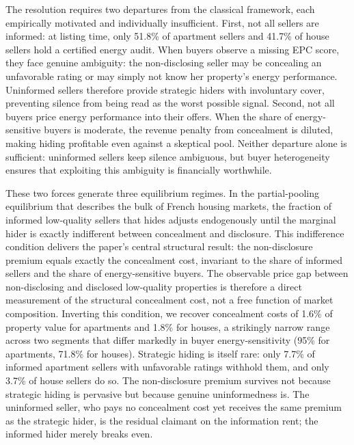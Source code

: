 \documentclass[10pt,letterpaper]{bp-template-concise}
\begin{document}
The resolution requires two departures from the classical framework, each empirically motivated and individually insufficient. First, not all sellers are informed: at listing time, only 51.8\% of apartment sellers and 41.7\% of house sellers hold a certified energy audit. When buyers observe a missing EPC score, they face genuine ambiguity: the non-disclosing seller may be concealing an unfavorable rating or may simply not know her property's energy performance. Uninformed sellers therefore provide strategic hiders with involuntary cover, preventing silence from being read as the worst possible signal. Second, not all buyers price energy performance into their offers. When the share of energy-sensitive buyers is moderate, the revenue penalty from concealment is diluted, making hiding profitable even against a skeptical pool. Neither departure alone is sufficient: uninformed sellers keep silence ambiguous, but buyer heterogeneity ensures that exploiting this ambiguity is financially worthwhile.

These two forces generate three equilibrium regimes. In the partial-pooling equilibrium that describes the bulk of French housing markets, the fraction of informed low-quality sellers that hides adjusts endogenously until the marginal hider is exactly indifferent between concealment and disclosure. This indifference condition delivers the paper's central structural result: the non-disclosure premium equals exactly the concealment cost, invariant to the share of informed sellers and the share of energy-sensitive buyers. The observable price gap between non-disclosing and disclosed low-quality properties is therefore a direct measurement of the structural concealment cost, not a free function of market composition. Inverting this condition, we recover concealment costs of 1.6\% of property value for apartments and 1.8\% for houses, a strikingly narrow range across two segments that differ markedly in buyer energy-sensitivity (95\% for apartments, 71.8\% for houses). Strategic hiding is itself rare: only 7.7\% of informed apartment sellers with unfavorable ratings withhold them, and only 3.7\% of house sellers do so. The non-disclosure premium survives not because strategic hiding is pervasive but because genuine uninformedness is. The uninformed seller, who pays no concealment cost yet receives the same premium as the strategic hider, is the residual claimant on the information rent; the informed hider merely breaks even.
\end{document}
